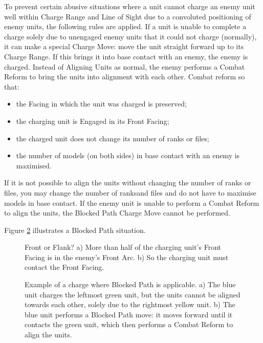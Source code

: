 To prevent certain abusive situations where a unit cannot charge an enemy unit well within Charge Range and Line of Sight due to a convoluted positioning of enemy units, the following rules are applied. If a unit is unable to complete a charge solely due to unengaged enemy units that it could not charge (normally), it can make a special Charge Move: move the unit straight forward up to its Charge Range. If this brings it into base contact with an enemy, the enemy is charged. Instead of Aligning Units as normal, the enemy performs a Combat Reform to bring the units into alignment with each other. Combat reform so that:

\begin{itemize}[label={-}]
\item the Facing in which the unit was charged is preserved;
\item the charging unit is Engaged in its Front Facing;
\item the charged unit does not change its number of ranks or files;
\item the number of models (on both sides) in base contact with an enemy is maximised.
\end{itemize}

If it is not possible to align the units without changing the number of ranks or files, you may change the number of ranksand files and do not have to maximise models in base contact. If the enemy unit is unable to perform a Combat Reform to align the units, the Blocked Path Charge Move cannot be performed.

Figure \ref{figure/blocked_path} illustrates a Blocked Path situation.

\newcommand{\chargefrontageCharge}{\normalfontsize{\flufffont{Charge!}}}
\newcommand{\chargefrontageA}{a)}
\newcommand{\chargefrontageB}{b)}

\begin{figure}[!htbp]
\centering
\def\svgwidth{0.6\textwidth}

\caption{Front or Flank?\captionpar
a) More than half of the charging unit's Front Facing is in the enemy's Front Arc.\newline
b) So the charging unit must contact the Front Facing.}
\label{figure/charge_frontage}
\end{figure}

\newcommand{\blockedpathCharge}{\normalfontsize{\flufffont{Charge!}}}
\newcommand{\blockedpathA}{a)}
\newcommand{\blockedpathB}{b)}

\begin{figure}[!htbp]
\centering
\def\svgwidth{0.6\textwidth}

\caption{Example of a charge where Blocked Path is applicable.\captionpar
a) The blue unit charges the leftmost green unit, but the units cannot be aligned towards each other, solely due to the rightmost yellow unit.\newline
b) The blue unit performs a Blocked Path move: it moves forward until it contacts the green unit, which then performs a Combat Reform to align the units.}
\label{figure/blocked_path}
\end{figure}


